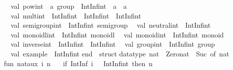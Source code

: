 \begin{isabellebody}
\begin{isamarkuptext}
\ \ val\ pow{}int\ {}\ {}a\ group\ {}{}\ IntInf{}int\ {}{}\ {}a\ {}{}\ {}a\isanewline
\ \ val\ mult{}int\ {}\ IntInf{}int\ {}{}\ IntInf{}int\ {}{}\ IntInf{}int\isanewline
\ \ val\ semigroup{}int\ {}\ IntInf{}int\ semigroup\isanewline
\ \ val\ neutral{}int\ {}\ IntInf{}int\isanewline
\ \ val\ monoidl{}int\ {}\ IntInf{}int\ monoidl\isanewline
\ \ val\ monoid{}int\ {}\ IntInf{}int\ monoid\isanewline
\ \ val\ inverse{}int\ {}\ IntInf{}int\ {}{}\ IntInf{}int\isanewline
\ \ val\ group{}int\ {}\ IntInf{}int\ group\isanewline
\ \ val\ example\ {}\ IntInf{}int\isanewline
end\ {}\ struct\isanewline
\isanewline
datatype\ nat\ {}\ Zero{}nat\ {}\ Suc\ of\ nat{}\isanewline
\isanewline
fun\ nat{}aux\ i\ n\ {}\isanewline
\ \ {}if\ IntInf{}{}{}\ {}i{}\ {}{}\ {}\ IntInf{}int{}{}\ then\ n\isanewline

\end{isamarkuptext}
\end{isabellebody}
